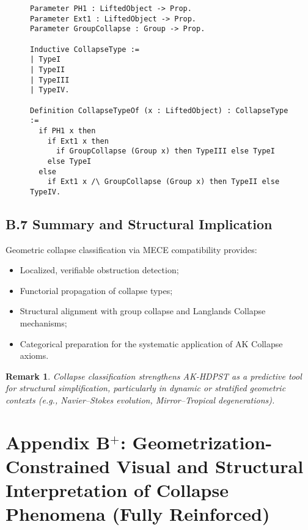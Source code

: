 \documentclass[11pt]{article}
\newtheorem{remark}[theorem]{Remark}
\begin{document}
\begin{figure}[h]
\centering
\begin{lstlisting}[language=Coq, caption=Collapse Type Assignment]
Parameter PH1 : LiftedObject -> Prop.
Parameter Ext1 : LiftedObject -> Prop.
Parameter GroupCollapse : Group -> Prop.

Inductive CollapseType :=
| TypeI
| TypeII
| TypeIII
| TypeIV.

Definition CollapseTypeOf (x : LiftedObject) : CollapseType :=
  if PH1 x then
    if Ext1 x then
      if GroupCollapse (Group x) then TypeIII else TypeI
    else TypeI
  else
    if Ext1 x /\ GroupCollapse (Group x) then TypeII else TypeIV.
\end{lstlisting}
\end{figure}

\subsection*{B.7 Summary and Structural Implication}

Geometric collapse classification via MECE compatibility provides:

\begin{itemize}
    \item Localized, verifiable obstruction detection;
    \item Functorial propagation of collapse types;
    \item Structural alignment with group collapse and Langlands Collapse mechanisms;
    \item Categorical preparation for the systematic application of AK Collapse axioms.
\end{itemize}

\begin{remark}
Collapse classification strengthens AK-HDPST as a predictive tool for structural simplification, particularly in dynamic or stratified geometric contexts (e.g., Navier–Stokes evolution, Mirror–Tropical degenerations).
\end{remark}




\section*{Appendix B$^{+}$: Geometrization-Constrained Visual and Structural Interpretation of Collapse Phenomena (Fully Reinforced)}
\end{document}
